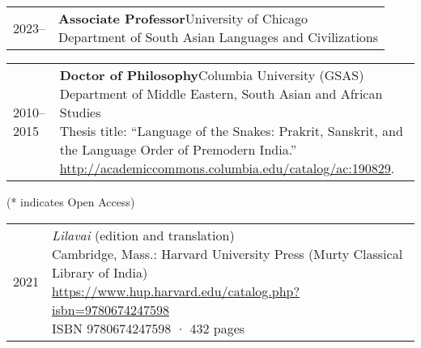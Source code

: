 \documentclass{scrartcl}
\begin{document}
\setlength{\tabcolsep}{0pt}
\newenvironment{entrylist}{%
  \begin{longtable}{@{\extracolsep{\fill}}ll}
}{%
  \end{longtable}
}
\newcommand{\entry}[4]{%
  {\addfontfeature{Color=gray} #1}&\parbox[t]{0.8\textwidth}{%
    \textbf{#2}\hfill #3\\ #4\vspace{\parsep}%
  }\\}
\newcommand{\refentry}[3]{%
  {\addfontfeature{Color=gray} #1}&\parbox[t]{0.8\textwidth}{%
    \raggedright#2\\ {{\raggedright\small #3}}\vspace{\parsep}%
  }\\}
\newcommand{\singleentry}[2]{%
  {\addfontfeature{Color=gray} #1}&\parbox[t]{0.8\textwidth}{%
    #2\vspace{\parsep}%
  }\\}
\raggedright

\begin{entrylist}
\entry
{2023–}
{Associate Professor}
{University of Chicago}
{Department of South Asian Languages and Civilizations}
\end{entrylist}


\begin{entrylist}
\entry
{2010--2015}
{Doctor of Philosophy}
{Columbia University (GSAS)}
{Department of Middle Eastern, South Asian and African Studies\\
Thesis title: ``Language of the Snakes: Prakrit, Sanskrit, and the Language Order of Premodern India.''\\
\url{http://academiccommons.columbia.edu/catalog/ac:190829}.}
\end{entrylist}\bigskip\bigskip

\sectionline 

(* indicates Open Access)\medskip

\begin{entrylist}
\singleentry
{2021}{\emph{Lilavai} (edition and translation)\\
Cambridge, Mass.: Harvard University Press (Murty Classical Library of India)\\
\url{https://www.hup.harvard.edu/catalog.php?isbn=9780674247598}\\
ISBN 9780674247598 · 432 pages}
\end{entrylist}
\end{document}
